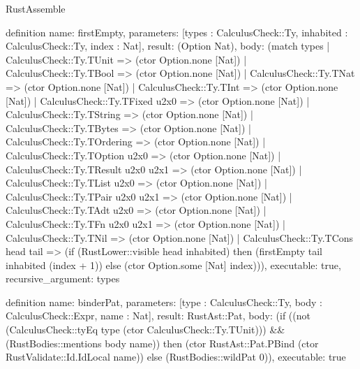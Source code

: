 \begin{lexlean}{RustAssemble}
\begin{semanticmodule}
definition{
  name: firstEmpty,
  parameters: [types : CalculusCheck::Ty, inhabited : CalculusCheck::Ty, index : Nat],
  result: (Option Nat),
  body: (match types
    | CalculusCheck::Ty.TUnit => (ctor Option.none [Nat])
    | CalculusCheck::Ty.TBool => (ctor Option.none [Nat])
    | CalculusCheck::Ty.TNat => (ctor Option.none [Nat])
    | CalculusCheck::Ty.TInt => (ctor Option.none [Nat])
    | CalculusCheck::Ty.TFixed u2x0 => (ctor Option.none [Nat])
    | CalculusCheck::Ty.TString => (ctor Option.none [Nat])
    | CalculusCheck::Ty.TBytes => (ctor Option.none [Nat])
    | CalculusCheck::Ty.TOrdering => (ctor Option.none [Nat])
    | CalculusCheck::Ty.TOption u2x0 => (ctor Option.none [Nat])
    | CalculusCheck::Ty.TResult u2x0 u2x1 => (ctor Option.none [Nat])
    | CalculusCheck::Ty.TList u2x0 => (ctor Option.none [Nat])
    | CalculusCheck::Ty.TPair u2x0 u2x1 => (ctor Option.none [Nat])
    | CalculusCheck::Ty.TAdt u2x0 => (ctor Option.none [Nat])
    | CalculusCheck::Ty.TFn u2x0 u2x1 => (ctor Option.none [Nat])
    | CalculusCheck::Ty.TNil => (ctor Option.none [Nat])
    | CalculusCheck::Ty.TCons head tail => (if (RustLower::visible head inhabited) then (firstEmpty tail inhabited (index + 1)) else (ctor Option.some [Nat] index))),
  executable: true,
  recursive_argument: types
}

definition{
  name: binderPat,
  parameters: [type : CalculusCheck::Ty, body : CalculusCheck::Expr, name : Nat],
  result: RustAst::Pat,
  body: (if ((not (CalculusCheck::tyEq type (ctor CalculusCheck::Ty.TUnit))) && (RustBodies::mentions body name)) then (ctor RustAst::Pat.PBind (ctor RustValidate::Id.IdLocal name)) else (RustBodies::wildPat 0)),
  executable: true
}


\end{semanticmodule}
\end{lexlean}
